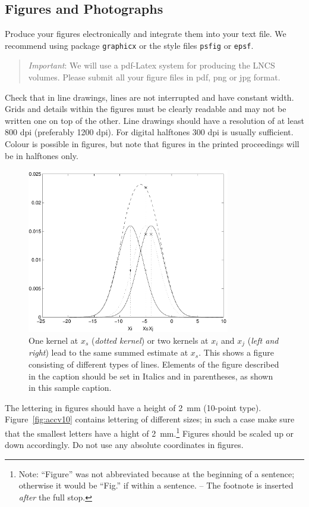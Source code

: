 \documentclass[runningheads]{llncs}
\begin{document}
\subsection{Figures and Photographs}
\label{sect:figures}

Produce your figures electronically and integrate
them into your text file. We recommend using package
\verb+graphicx+ or the style files \verb+psfig+ or \verb+epsf+.

\begin{quote}
{\it Important}: We will use a pdf-Latex system for producing the LNCS volumes.
Please submit all your figure files in pdf, png or jpg format.
\end{quote}

Check that in line drawings, lines are not
interrupted and have constant width. Grids and details within the
figures must be clearly readable and may not be written one on top of
the other. Line drawings should have a resolution of at least 800 dpi
(preferably 1200 dpi).
For digital halftones 300 dpi is usually sufficient. Colour is possible in
figures, but note that figures in the printed proceedings will be in 
halftones only.

\begin{figure}
\centering
\includegraphics[height=72mm]{eijkel2}
\caption{
One kernel at $x_s$ ({\it dotted kernel}) or two kernels at
$x_i$ and $x_j$ ({\it left and right}) lead to the same summed estimate
at $x_s$. This shows a figure consisting of different types of
lines. Elements of the figure described in the caption should be set in
Italics and in parentheses, as shown in this sample caption.
}
\label{fig:example}
\end{figure}

The lettering in figures should have a height of 2~mm (10-point type).
Figure~\ref{fig:accv10} contains lettering of different sizes; in such a case
make sure that the smallest letters have a hight of 2~mm.\footnote
   {Note: ``Figure''
    was not abbreviated because at the beginning of a sentence; otherwise
    it would be ``Fig.'' if within a sentence. -- The footnote is inserted {\it after}
    the full stop.
    }
Figures should be scaled up or down accordingly.
Do not use any absolute coordinates in figures.
\end{document}
